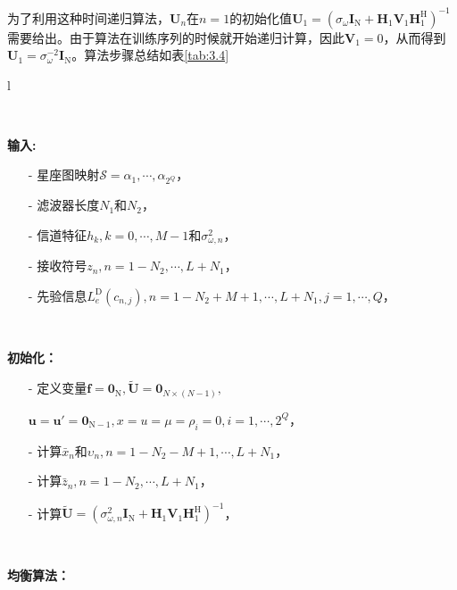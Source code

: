 为了利用这种时间递归算法，$\mathbf{U}_n$在$n=1$的初始化值$\mathbf{U}_1=(\sigma_{\omega}\mathbf{I}_{\mathrm{N}}+\mathbf{H}_1\mathbf{V}_1\mathbf{H}_1^{\mathrm{H}})^{-1}$需要给出。由于算法在训练序列的时候就开始递归计算，因此$\mathbf{V}_1=0$，从而得到$\mathbf{U}_1=\sigma_{\omega}^{-2}\mathbf{I}_{\mathrm{N}}$。算法步骤总结如表\ref{tab:3.4}
\begin{longtable}{l}
  \caption{MMSE-LE递归算法总结}
  \label{tab:3.4}\\

  \endfirsthead


  \endhead
  
  \hline
  \endfoot
  \endlastfoot
    \hline
    \begin{minipage}[tb]{15cm}
        \textbf{\xiaosan 输入:}
    \begin{itemize}
        \item[-]  星座图映射$\mathcal{S}={\alpha_1,\cdots,\alpha_{2^Q}}$，
        \item[-]  滤波器长度$N_1$和$N_2$，
        \item[-]  信道特征$h_k,k=0,\cdots,M-1$和$\sigma_{\omega,n}^2$，
        \item[-]  接收符号$z_n,n=1-N_2,\cdots,L+N_1$，
        \item[-]
            先验信息$L_e^{\mathrm{D}}(c_{n,j}),n=1-N_2+M+1,\cdots,L+N_1,j=1,\cdots,Q$，
    \end{itemize}
    \vspace{5mm}
\end{minipage}\\
    \hline
    \begin{minipage}[tb]{15cm}
        \textbf{\xiaosan 初始化：}
    \begin{itemize}
        \item[-]
            定义变量$\mathbf{f}=\mathbf{0}_{\mathrm{N}},\tilde{\mathbf{U}}=\mathbf{0}_{N\times(N-1)},$
            
            $\mathbf{u}={\mathbf{u}}'=\mathbf{0}_{\mathrm{N}-1},x=u=\mu=\rho_i=0,i=1,\cdots,2^Q$，
        \item[-]   计算$\bar{x}_n$和$\upsilon_n,n=1-N_2-M+1,\cdots,L+N_1$，
        \item[-]   计算$\bar{z}_n,n=1-N_2,\cdots,L+N_1$，
        \item[-]
            计算$\tilde{\mathbf{U}}=(\sigma_{\omega,n}^2\mathbf{I}_{\mathrm{N}}+\mathbf{H}_1\mathbf{V}_1\mathbf{H}_1^{\mathrm{H}})^{-1}$，
    \end{itemize}
    \vspace{5mm}
\end{minipage}\\
    \hline
    \begin{minipage}[tb]{15cm}
        \textbf{\xiaosan 均衡算法：}


\end{minipage}
\end{longtable}
